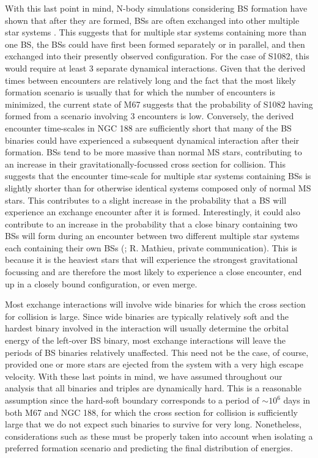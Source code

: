 With this last point in mind, N-body simulations considering BS
formation have shown that after they are formed, BSs are often
exchanged into other multiple star systems \citep{hurley05}.  This
suggests that for multiple star systems containing more than one BS,
the BSs could have first been formed separately or in parallel, and
then exchanged into their presently observed configuration.  For the
case of S1082, this would require at least 3 separate dynamical
interactions.  Given that the derived times between encounters are
relatively long and the fact
that the most likely formation scenario is usually that for which the
number of encounters is minimized, the current state of M67 suggests
that the probability of S1082 having formed from a scenario involving
3 encounters is low.  Conversely, the derived encounter time-scales in
NGC 188 are sufficiently short that many of the BS binaries 
could have experienced a subsequent dynamical interaction after their
formation.  BSs tend to 
be more massive than normal MS stars, contributing to an increase in
their gravitationally-focussed cross section for collision.  This
suggests that the encounter time-scale for multiple star systems
containing BSs is slightly shorter than for otherwise
identical systems composed only of normal MS stars.  This contributes
to a slight increase in the probability that a BS will experience an
exchange encounter after it is formed.  Interestingly, it could also contribute to
an increase in the probability that a close binary containing two BSs
will form during an encounter between two different multiple star
systems each containing their own BSs (\citet{mathieu09}; R. Mathieu,
private communication).  This is because it is the
heaviest stars that will experience the strongest gravitational
focussing and are therefore the most likely to experience a close
encounter, end up in a closely bound configuration, or even merge.

Most exchange interactions will involve wide binaries for which
the cross section for collision 
is large.  Since wide binaries are typically relatively soft and the
hardest binary involved in the interaction will usually determine the
orbital energy of the left-over BS binary, most exchange interactions
will leave the periods of BS binaries relatively unaffected.  This
need not be the case, of course, provided one or more stars are
ejected from the system with a very high escape velocity.  With
these last points in mind, we have assumed throughout our analysis that
all binaries and triples are dynamically hard.  This is a reasonable
assumption since the hard-soft boundary corresponds to a period of
$\sim 10^6$ days in both M67 and NGC 188, for which the cross section
for collision is sufficiently large that we do not expect such
binaries to survive for very long.  Nonetheless, considerations such
as these must be properly taken into account when isolating a
preferred formation scenario and predicting the final distribution of
energies.

